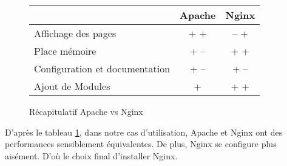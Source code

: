 \begin{figure}[H]
\begin{center}
\begin{tabular}{|m{175pt}|c|c|}
	\hline
	\null & \textbf{Apache} & \textbf{Nginx} \\
	\hline
	Affichage des pages & + + & -- +\\
	\hline
	Place mémoire & + -- & + +\\
	\hline
	Configuration et documentation & + -- & + -- \\
	\hline
	Ajout de Modules & + & + +  \\
	\hline
\end{tabular} \vspace*{5mm}
\caption{\label{ServerTable} Récapitulatif Apache vs Nginx}
\end{center}
\end{figure}


D'après le tableau \ref{ServerTable}, dans notre cas d'utilisation, Apache et Nginx ont des performances sensiblement équivalentes. De plus, Nginx se configure plus aisément. D'où le choix final d'installer Nginx.